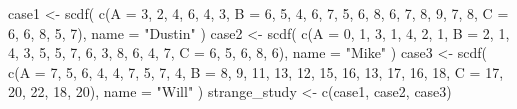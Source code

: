 \documentclass[
  letterpaper,
  DIV=11,
  numbers=noendperiod]{scrreprt}
\newenvironment{Shaded}{\begin{snugshade}}{\end{snugshade}}
\newcommand{\AttributeTok}[1]{\textcolor[rgb]{0.40,0.45,0.13}{#1}}
\newcommand{\DecValTok}[1]{\textcolor[rgb]{0.68,0.00,0.00}{#1}}
\newcommand{\FunctionTok}[1]{\textcolor[rgb]{0.28,0.35,0.67}{#1}}
\newcommand{\NormalTok}[1]{\textcolor[rgb]{0.00,0.23,0.31}{#1}}
\newcommand{\OtherTok}[1]{\textcolor[rgb]{0.00,0.23,0.31}{#1}}
\newcommand{\StringTok}[1]{\textcolor[rgb]{0.13,0.47,0.30}{#1}}
\begin{document}
\begin{Shaded}
\begin{Highlighting}[]
\NormalTok{case1 }\OtherTok{\textless{}{-}} \FunctionTok{scdf}\NormalTok{(}
  \FunctionTok{c}\NormalTok{(}\AttributeTok{A =} \DecValTok{3}\NormalTok{, }\DecValTok{2}\NormalTok{, }\DecValTok{4}\NormalTok{, }\DecValTok{6}\NormalTok{, }\DecValTok{4}\NormalTok{, }\DecValTok{3}\NormalTok{, }
    \AttributeTok{B =} \DecValTok{6}\NormalTok{, }\DecValTok{5}\NormalTok{, }\DecValTok{4}\NormalTok{, }\DecValTok{6}\NormalTok{, }\DecValTok{7}\NormalTok{, }\DecValTok{5}\NormalTok{, }\DecValTok{6}\NormalTok{, }\DecValTok{8}\NormalTok{, }\DecValTok{6}\NormalTok{, }\DecValTok{7}\NormalTok{, }\DecValTok{8}\NormalTok{, }\DecValTok{9}\NormalTok{, }\DecValTok{7}\NormalTok{, }\DecValTok{8}\NormalTok{, }
    \AttributeTok{C =} \DecValTok{6}\NormalTok{, }\DecValTok{6}\NormalTok{, }\DecValTok{8}\NormalTok{, }\DecValTok{5}\NormalTok{, }\DecValTok{7}\NormalTok{), }
  \AttributeTok{name =} \StringTok{"Dustin"}
\NormalTok{)}
\NormalTok{case2 }\OtherTok{\textless{}{-}} \FunctionTok{scdf}\NormalTok{(}
  \FunctionTok{c}\NormalTok{(}\AttributeTok{A =} \DecValTok{0}\NormalTok{, }\DecValTok{1}\NormalTok{, }\DecValTok{3}\NormalTok{, }\DecValTok{1}\NormalTok{, }\DecValTok{4}\NormalTok{, }\DecValTok{2}\NormalTok{, }\DecValTok{1}\NormalTok{, }
    \AttributeTok{B =} \DecValTok{2}\NormalTok{, }\DecValTok{1}\NormalTok{, }\DecValTok{4}\NormalTok{, }\DecValTok{3}\NormalTok{, }\DecValTok{5}\NormalTok{, }\DecValTok{5}\NormalTok{, }\DecValTok{7}\NormalTok{, }\DecValTok{6}\NormalTok{, }\DecValTok{3}\NormalTok{, }\DecValTok{8}\NormalTok{, }\DecValTok{6}\NormalTok{, }\DecValTok{4}\NormalTok{, }\DecValTok{7}\NormalTok{, }
    \AttributeTok{C =} \DecValTok{6}\NormalTok{, }\DecValTok{5}\NormalTok{, }\DecValTok{6}\NormalTok{, }\DecValTok{8}\NormalTok{, }\DecValTok{6}\NormalTok{), }
  \AttributeTok{name =} \StringTok{"Mike"}
\NormalTok{)}
\NormalTok{case3 }\OtherTok{\textless{}{-}} \FunctionTok{scdf}\NormalTok{(}
  \FunctionTok{c}\NormalTok{(}\AttributeTok{A =} \DecValTok{7}\NormalTok{, }\DecValTok{5}\NormalTok{, }\DecValTok{6}\NormalTok{, }\DecValTok{4}\NormalTok{, }\DecValTok{4}\NormalTok{, }\DecValTok{7}\NormalTok{, }\DecValTok{5}\NormalTok{, }\DecValTok{7}\NormalTok{, }\DecValTok{4}\NormalTok{,}
    \AttributeTok{B =} \DecValTok{8}\NormalTok{, }\DecValTok{9}\NormalTok{, }\DecValTok{11}\NormalTok{, }\DecValTok{13}\NormalTok{, }\DecValTok{12}\NormalTok{, }\DecValTok{15}\NormalTok{, }\DecValTok{16}\NormalTok{, }\DecValTok{13}\NormalTok{, }\DecValTok{17}\NormalTok{, }\DecValTok{16}\NormalTok{, }\DecValTok{18}\NormalTok{,}
    \AttributeTok{C =} \DecValTok{17}\NormalTok{, }\DecValTok{20}\NormalTok{, }\DecValTok{22}\NormalTok{, }\DecValTok{18}\NormalTok{, }\DecValTok{20}\NormalTok{), }
  \AttributeTok{name =} \StringTok{"Will"}
\NormalTok{)}
\NormalTok{strange\_study }\OtherTok{\textless{}{-}} \FunctionTok{c}\NormalTok{(case1, case2, case3)}
\end{Highlighting}
\end{Shaded}
\end{document}
